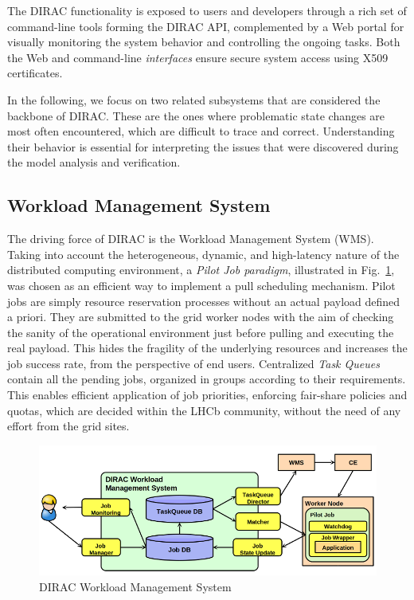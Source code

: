 \documentclass[10pt,conference]{IEEEtran}
\begin{document}
The DIRAC functionality is exposed to users and developers through a rich set of
command-line tools forming the DIRAC API, complemented by a Web portal for
visually monitoring  the system behavior and controlling the ongoing tasks. Both
the Web and command-line \textit{interfaces} ensure secure system access using X509
certificates. 

In the following, we focus on two related subsystems that are considered the backbone of DIRAC. These
are the ones where problematic state changes are most often encountered,
 which are difficult to trace and correct. Understanding their behavior 
is essential for interpreting the issues that were discovered during the model analysis and verification.

\subsection{Workload Management System}

The driving force of DIRAC is the Workload Management System (WMS). Taking into
account the heterogeneous, dynamic, and high-latency nature of the distributed computing environment, a
\textit{Pilot Job paradigm}, illustrated in Fig.~\ref{fig:DIRAC-WMS}, was chosen as an efficient way to
implement a pull scheduling mechanism.  Pilot jobs are simply resource
reservation processes without an actual payload defined a priori. They are
submitted to the grid worker nodes with the aim of checking the sanity of the
operational environment just before pulling and executing the real payload. This
hides the fragility of the underlying resources and increases the job success
rate, from the perspective of end users. Centralized \textit{Task Queues} contain all the
pending jobs, organized in groups according to their requirements. This enables
efficient application of job priorities, enforcing fair-share policies and
quotas, which are decided within the LHCb community, without the need of any
effort from the grid sites.  
\begin{figure}[b]
\vspace{-15 pt}
\includegraphics[width=\linewidth,keepaspectratio=true]{./DIRAC_WMS1.png}
\centering
\caption{DIRAC Workload Management System \cite{DIRAC_pilot_WMS}}
\label{fig:DIRAC-WMS}
\end{figure}
 
\end{document}
